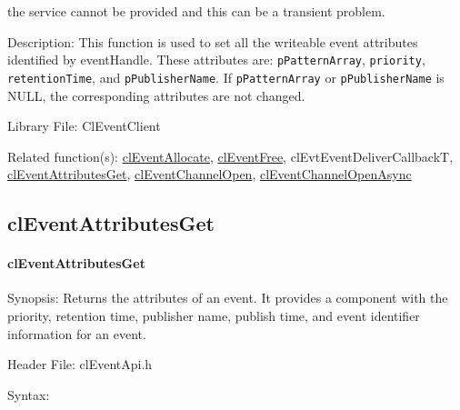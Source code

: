 \begin{flushleft}
\begin{Desc}
\begin{description}
the service cannot be provided and this can be a transient problem.
\end{description}
\end{Desc}
\begin{Desc}
\item[Description:]This function is used to set all the writeable event attributes identified by eventHandle. These attributes are: {\tt{pPatternArray}}, 
{\tt{priority}}, {\tt{retentionTime}}, and {\tt{pPublisherName}}.
If {\tt{pPatternArray}} or {\tt{pPublisherName}} is NULL, the corresponding attributes are not changed. 
\end{Desc}
\begin{Desc}
\item[Library File:]Cl\-Event\-Client\end{Desc}
\begin{Desc}
\item[Related function(s):]\hyperlink{pageem107}{cl\-Event\-Allocate}, \hyperlink{pageem108}{cl\-Event\-Free}, cl\-Evt\-Event\-Deliver\-Callback\-T, 
\hyperlink{pageem110}{cl\-Event\-Attributes\-Get}, \hyperlink{pageem103}{cl\-Event\-Channel\-Open}, 
\hyperlink{pageem104}{cl\-Event\-Channel\-Open\-Async} \end{Desc}
\newpage


\subsection{clEventAttributesGet}
\hypertarget{pageem110}{}\paragraph{cl\-Event\-Attributes\-Get}\label{pageem110}
\begin{Desc}
\item[Synopsis:]Returns the attributes of an event. It provides a component with the priority, retention time, publisher name, publish time,
and event identifier information for an event.
\end{Desc}
\begin{Desc}
\item[Header File:]clEventApi.h\end{Desc}
\begin{Desc}
\item[Syntax:]


\end{Desc}
\end{flushleft}
